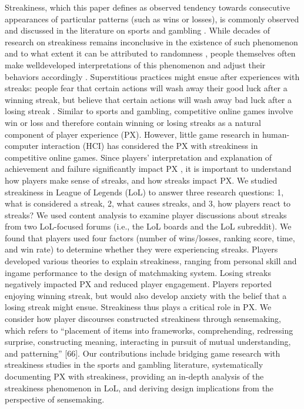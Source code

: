 Streakiness, which this paper defines as observed tendency
towards consecutive appearances of particular patterns
(such as wins or losses), is commonly observed and
discussed in the literature on sports  and gambling .
While decades of research on streakiness remains
inconclusive in the existence of such phenomenon and to 
what extent it can be attributed to randomness
, people themselves often make welldeveloped
interpretations of this phenomenon and adjust
their behaviors accordingly . Superstitious practices
might ensue after experiences with streaks: people fear that
certain actions will wash away their good luck after a
winning streak, but believe that certain actions will wash
away bad luck after a losing streak .
Similar to sports and gambling, competitive online games
involve win or loss and therefore contain winning or losing
streaks as a natural component of player experience (PX).
However, little game research in human-computer
interaction (HCI) has considered the PX with streakiness in
competitive online games. Since players’ interpretation and
explanation of achievement and failure significantly impact
PX , it is important to understand how players make
sense of streaks, and how streaks impact PX.
We studied streakiness in League of Legends (LoL) to
answer three research questions: 1, what is considered a
streak, 2, what causes streaks, and 3, how players react to
streaks? We used content analysis to examine player
discussions about streaks from two LoL-focused forums
(i.e., the LoL boards and the LoL subreddit). We found that
players used four factors (number of wins/losses, ranking
score, time, and win rate) to determine whether they were
experiencing streaks. Players developed various theories to
explain streakiness, ranging from personal skill and ingame
performance to the design of matchmaking system.
Losing streaks negatively impacted PX and reduced player
engagement. Players reported enjoying winning streak, but
would also develop anxiety with the belief that a losing
streak might ensue. Streakiness thus plays a critical role in
PX. We consider how player discourses constructed
streakiness through sensemaking, which refers to
“placement of items into frameworks, comprehending,
redressing surprise, constructing meaning, interacting in
pursuit of mutual understanding, and patterning” [66]. Our
contributions include bridging game research with
streakiness studies in the sports and gambling literature,
systematically documenting PX with streakiness, providing
an in-depth analysis of the streakiness phenomenon in LoL,
and deriving design implications from the perspective of
sensemaking. 


